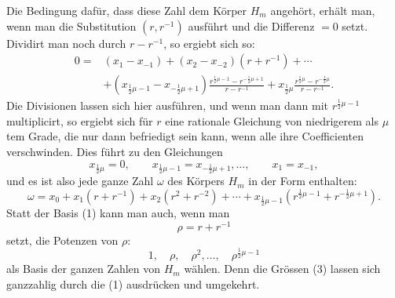 \documentclass[11pt]{article}
\begin{document}
Die Bedingung dafür, dass diese Zahl dem Körper $H_m$ angehört, erhält man, wenn man die Substitution $(r,r^{-1})$ ausführt und die Differenz $=0$ setzt. Dividirt man noch durch $r-r^{-1}$, so ergiebt sich so:
\begin{align*}
0={}&(x_1-x_{-1})+(x_2-x_{-2})(r+r^{-1})+\cdots \\
&+(x_{\frac12\mu-1}-x_{-\frac12\mu+1})\frac{r^{\frac12\mu-1}-r^{-\frac12\mu+1}}{r-r^{-1}}
+x_{\frac12\mu}\frac{r^{\frac12\mu}-r^{-\frac12\mu}}{r-r^{-1}}.
\end{align*}
Die Divisionen lassen sich hier ausführen, und wenn man dann mit $r^{\frac12\mu-1}$ multiplicirt, so ergiebt sich für $r$ eine rationale Gleichung von niedrigerem als $\mu$tem Grade, die nur dann befriedigt sein kann, wenn alle ihre Coefficienten verschwinden. Dies führt zu den Gleichungen
\[
x_{\frac12\mu}=0,\qquad x_{\frac12\mu-1}=x_{-\frac12\mu+1},\ldots,\qquad x_1=x_{-1},
\]
und es ist also jede ganze Zahl $\omega$ des Körpers $H_m$ in der Form enthalten:
\[
\omega=x_0+x_1(r+r^{-1})+x_2(r^2+r^{-2})+\cdots+x_{\frac12\mu-1}(r^{\frac12\mu-1}+r^{-\frac12\mu+1}).
\]
Statt der Basis (1) kann man auch, wenn man
\[
\rho=r+r^{-1}
\]
setzt, die Potenzen von $\rho$:
\begin{equation}
1,\quad \rho,\quad \rho^2,\ldots,\quad \rho^{\frac12\mu-1}
\tag{3}
\end{equation}
als Basis der ganzen Zahlen von $H_m$ wählen. Denn die Grössen (3) lassen sich ganzzahlig durch die (1) ausdrücken und umgekehrt.
\end{document}
